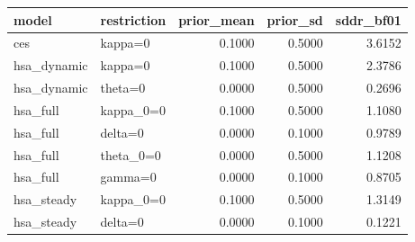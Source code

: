 \begin{tabular}{llrrr}
\toprule
model & restriction & prior\_mean & prior\_sd & sddr\_bf01 \\
\midrule
ces & kappa=0 & 0.1000 & 0.5000 & 3.6152 \\
hsa\_dynamic & kappa=0 & 0.1000 & 0.5000 & 2.3786 \\
hsa\_dynamic & theta=0 & 0.0000 & 0.5000 & 0.2696 \\
hsa\_full & kappa\_0=0 & 0.1000 & 0.5000 & 1.1080 \\
hsa\_full & delta=0 & 0.0000 & 0.1000 & 0.9789 \\
hsa\_full & theta\_0=0 & 0.0000 & 0.5000 & 1.1208 \\
hsa\_full & gamma=0 & 0.0000 & 0.1000 & 0.8705 \\
hsa\_steady & kappa\_0=0 & 0.1000 & 0.5000 & 1.3149 \\
hsa\_steady & delta=0 & 0.0000 & 0.1000 & 0.1221 \\
\bottomrule
\end{tabular}
